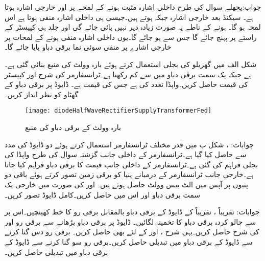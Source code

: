 جواب:پچھلے سوال کی طرح داخلی اشارہ مثبت ہونے کے لمحے پر  اور خارجی اشارہ  ہوتا ہے۔ سیکنڈ بعد خارجی اشارہ  جبکہ  ہوتے ہیں۔جیسی ہی داخلی اشارہ منفی ہوتا ہے اس لمحہ  ہو گا۔ ہونے کے ناطے یہ صورت زیادہ دیر نہیں پائی جائے گی اور جلد ہی کپیسٹر  کے راستے  پر پہنچ جائے گا جس سے  ہو جائے گا۔یوں داخلی اشارہ منفی ہونے کے لمحات پر خارجی اشارے پر منفی سوئی نما برقی دباو پایا جائے گا۔

شکل  الف میں گھریلو  کی بجلی استعمال کرتے ہوئے بارہ وولٹ کی منبع بنائی گئی ہے۔ ہے جبکہ یک سمت برقی دباو میں   سے کم رکھنا ہے۔ٹرانسفارمر کی شرح  اور کپیسٹر کی قیمت حاصل کریں۔واپڈا  تعدد کی  ہے جس کی  قیمت  ہے۔ ڈایوڈ پر برقی دباو کے گھٹاو کو نظر انداز کریں۔
\begin{figure}
\centering
\texttt{[image: diodeHalfWaveRectifierSupplyTransformerFed]}
\caption{بارہ وولٹ کے برقی دباو کی منبع}
\label{شکل_بارہ_وولٹ-منبع}
\end{figure}

جوابات: ،  
شکل  ب میں قدر مختلف ٹرانسفارمر استعمال کرتے ہوئے دو ڈایوڈ کی مدد سے  حاصل کیا گیا ہے۔ٹرانسفارمر کے داخلی جانب گزشتہ سوال کی طرح واپڈا کی بجلی فراہم کی گئی ہے۔ٹرانسفارمر کے داخلی جانب   قیمت کا برقی دباو فراہم کیا جاتا ہے۔خارجی جانب ٹرانسفارمر کے درمیانے پنیا کو برقی زمین تصور کرتے ہوئے  باقی دو پنیوں پر آپس میں الٹ بیس وولٹ حاصل ہوتے ہیں۔ اور  کی صورت میں خارجی یک سمت برقی دباو  اور اس میں  حاصل کریں۔کامل ڈایوڈ تصور کریں۔

جوابات: تقریباً  ، تقریباً 
 کے ڈایوڈ کے برقی دباو بالمقابل برقی رو کا خط کھینچیں۔اس پر سے چالو کردہ برقی دباو کا تخمینہ لگائیں۔ 
ڈایوڈ پر برقی دباو  بڑھانے سے برقی رو  اور  کی شرح حاصل کریں۔یہی شرح ،  اور  کے لئے بھی حاصل کریں۔   
برقی رو دس گنا کرنے سے ڈایوڈ کے برقی دباو میں تبدیلی حاصل کریں۔برقی رو سو گنا کرنے سے ڈایوڈ کے برقی دباو میں تبدیلی حاصل کریں۔


